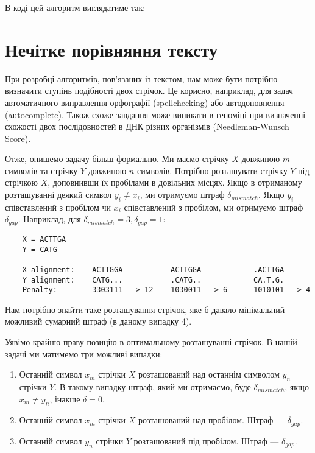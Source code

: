 \documentclass[12pt,a4paper]{report}
\begin{document}
В коді цей алгоритм виглядатиме так:





\section{Нечітке порівняння тексту}

При розробці алгоритмів, пов’язаних із текстом, нам може бути потрібно визначити ступінь подібності двох стрічок. Це корисно, наприклад, для задач автоматичного виправлення орфографії (spellchecking) або автодоповнення (autocomplete). Також схоже завдання може виникати в геноміці при визначенні схожості двох послідовностей в ДНК різних організмів (Needleman-Wunsch Score).

Отже, опишемо задачу більш формально. Ми маємо стрічку \(X\) довжиною \(m\) символів та стрічку \(Y\) довжиною \(n\) символів. Потрібно розташувати стрічку \(Y\) під стрічкою \(X\), доповнивши їх пробілами в довільних місцях. Якщо в отриманому розташуванні деякий символ \(y_i \neq x_i\), ми отримуємо штраф \(\delta_{mismatch}\). Якщо \(y_i\) співставлений з пробілом чи \(x_i\) співставлений з пробілом, ми отримуємо штраф \(\delta_{gap}\). Наприклад, для \(\delta_{mismatch} = 3, \delta_{gap} = 1\):

\begin{lstlisting}
    X = ACTTGA
    Y = CATG

    X alignment:    ACTTGGA           ACTTGGA            .ACTTGA
    Y alignment:    CATG...           .CATG..            CA.T.G.
    Penalty:        3303111  -> 12    1030011  -> 6      1010101  -> 4
\end{lstlisting}

Нам потрібно знайти таке розташування стрічок, яке б давало мінімальний можливий сумарний штраф (в даному випадку 4).

Уявімо крайню праву позицію в оптимальному розташуванні стрічок. В нашій задачі ми матимемо три можливі випадки:

\begin{enumerate}
    \item Останній символ \(x_m\) стрічки \(X\) розташований над останнім символом \(y_n\) стрічки \(Y\). В такому випадку штраф, який ми отримаємо, буде \(\delta_{mismatch}\), якщо \(x_m \neq y_n\), інакше \(\delta = 0\).
    \item Останній символ \(x_m\) стрічки \(X\) розташований над пробілом. Штраф --- \(\delta_{gap}\).
    \item Останній символ \(y_n\) стрічки \(Y\) розташований під пробілом. Штраф --- \(\delta_{gap}\).
\end{enumerate}
\end{document}
